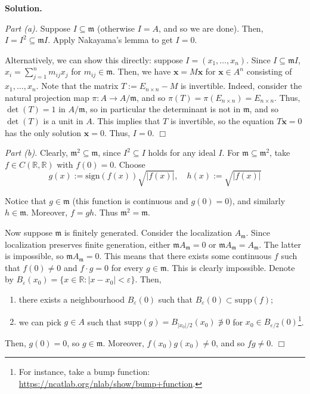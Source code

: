 \documentclass{template}
\newcommand{\qedwhite}{\hfill \ensuremath{\Box}}
\begin{document}
\textbf{Solution.}

\textit{Part (a).} Suppose $I \subseteq \mathfrak{m}$ (otherwise $I=A$, and so
we are done). Then, $I = I^2 \subseteq \mathfrak{m}I$. Apply Nakayama's lemma to
get $I=0$. 

Alternatively, we can show this directly: suppose $I = (x_1,\dots,x_n)$. Since
$I \subseteq \mathfrak{m}I$, $x_i = \sum_{j=1}^n m_{ij}x_j$ for $m_{ij} \in
\mathfrak{m}$. Then, we have $\mathbf{x} = M\mathbf{x}$ for $\mathbf{x} \in A^n$
consisting of $x_1,\dots,x_n$. Note that the matrix $T := E_{n \times n}-M$ is
invertible. Indeed, consider the natural projection map $\pi: A \to
A/\mathfrak{m}$, and so $\pi(T) = \pi(E_{n \times n}) = E_{n \times n}$. Thus,
$\det(T) = 1$ in $A/\mathfrak{m}$, so in particular the determinant is not in
$\mathfrak{m}$, and so $\det(T)$ is a unit in $A$. This implies that $T$ is
invertible, so the equation $T\mathbf{x}=0$ has the only solution $\mathbf{x} =
0$. Thus, $I=0$. \qedwhite

\textit{Part (b).} Clearly, $\mathfrak{m}^2 \subseteq \mathfrak{m}$, since $I^2
\subseteq I$ holds for any ideal $I$. For $\mathfrak{m} \subseteq
\mathfrak{m}^2$, take $f \in C(\mathbb{R},\mathbb{R})$ with $f(0)=0$.
Choose
\begin{equation*}
    g(x) := \text{sign}(f(x))\sqrt{|f(x)|}, \quad h(x) := \sqrt{|f(x)|}
\end{equation*}

Notice that $g \in \mathfrak{m}$ (this function is continuous and $g(0)=0$), and
similarly $h \in \mathfrak{m}$. Moreover, $f=gh$. Thus
$\mathfrak{m}^2=\mathfrak{m}$. 

Now suppose $\mathfrak{m}$ is finitely generated. Consider the localization
$A_{\mathfrak{m}}$. Since localization preserves finite generation, either
$\mathfrak{m}A_{\mathfrak{m}}=0$ or
$\mathfrak{m}A_{\mathfrak{m}}=A_{\mathfrak{m}}$. The latter is impossible, so
$\mathfrak{m}A_{\mathfrak{m}}=0$. This means that there exists some continuous
$f$ such that $f(0) \neq 0$ and $f\cdot g = 0$ for every $g \in \mathfrak{m}$.
This is clearly impossible. Denote by $B_{\varepsilon}(x_0) = \{x \in
\mathbb{R}: |x-x_0|<\varepsilon\}$. Then,
\begin{enumerate}
    \item[(1)] there exists a neighbourhood $B_{\varepsilon}(0)$ such that
$B_{\varepsilon}(0) \subset \text{supp}(f)$;
    \item[(2)] we can pick $g \in A$ such that $\text{supp}(g) =
B_{|x_0|/2}(x_0) \not\ni 0$ for $x_0 \in B_{\varepsilon/2}(0)$\footnote{For
instance, take a bump function:
\url{https://ncatlab.org/nlab/show/bump+function}.}.
\end{enumerate}

Then, $g(0)=0$, so $g \in \mathfrak{m}$. Moreover, $f(x_0)g(x_0) \neq 0$, and so
$fg \neq 0$. \qedwhite
\end{document}
